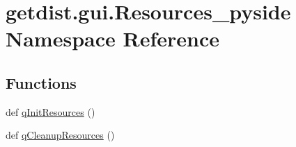 \hypertarget{namespacegetdist_1_1gui_1_1Resources__pyside}{}\section{getdist.\+gui.\+Resources\+\_\+pyside Namespace Reference}
\label{namespacegetdist_1_1gui_1_1Resources__pyside}
\subsection*{Functions}
\begin{DoxyCompactItemize}
\item 
def \mbox{\hyperlink{namespacegetdist_1_1gui_1_1Resources__pyside_a0cc0e01d43533b37582a95a0061db0f8}{q\+Init\+Resources}} ()
\item 
def \mbox{\hyperlink{namespacegetdist_1_1gui_1_1Resources__pyside_a92e826086b118b8a15304a28b858a8f4}{q\+Cleanup\+Resources}} ()
\end{DoxyCompactItemize}
